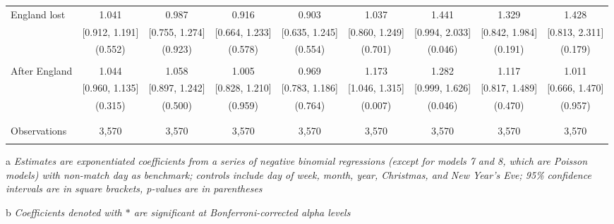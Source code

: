 \documentclass[12pt, a4paper]{article}
\begin{document}
\begin{table}
\begin{threeparttable}
\begin{tabular}{@{\extracolsep{1pt}}lcccccccc}
 England lost & 1.041 & 0.987 & 0.916 & 0.903 & 1.037 & 1.441 & 1.329 & 1.428 \\ 
  & [0.912, 1.191] & [0.755, 1.274] & [0.664, 1.233] & [0.635, 1.245] & [0.860, 1.249] & [0.994, 2.033] & [0.842, 1.984] & [0.813, 2.311] \\ 
  & (0.552) & (0.923) & (0.578) & (0.554) & (0.701) & (0.046) & (0.191) & (0.179) \\ 
  & & & & & & & & \\ 
 After England & 1.044 & 1.058 & 1.005 & 0.969 & 1.173 & 1.282 & 1.117 & 1.011 \\ 
  & [0.960, 1.135] & [0.897, 1.242] & [0.828, 1.210] & [0.783, 1.186] & [1.046, 1.315] & [0.999, 1.626] & [0.817, 1.489] & [0.666, 1.470] \\ 
  & (0.315) & (0.500) & (0.959) & (0.764) & (0.007) & (0.046) & (0.470) & (0.957) \\ 
  & & & & & & & & \\ 
\hline \\[-1.8ex] 
Observations & 3,570 & 3,570 & 3,570 & 3,570 & 3,570 & 3,570 & 3,570 & 3,570 \\ 
\hline 
\hline \\[-1.8ex] 
\end{tabular} 
\begin{tablenotes}
      \item[a] \textit{Estimates are exponentiated coefficients from a series of negative binomial regressions (except for models 7 and 8, which are Poisson models) with non-match day as benchmark; controls include day of week, month, year, Christmas, and New Year's Eve; 95\% confidence intervals are in square brackets, p-values are in parentheses}
             \item[b] \textit{Coefficients denoted with $*$ are significant at Bonferroni-corrected alpha levels}
    \end{tablenotes}
\end{threeparttable} 
\end{table}
\end{document}
